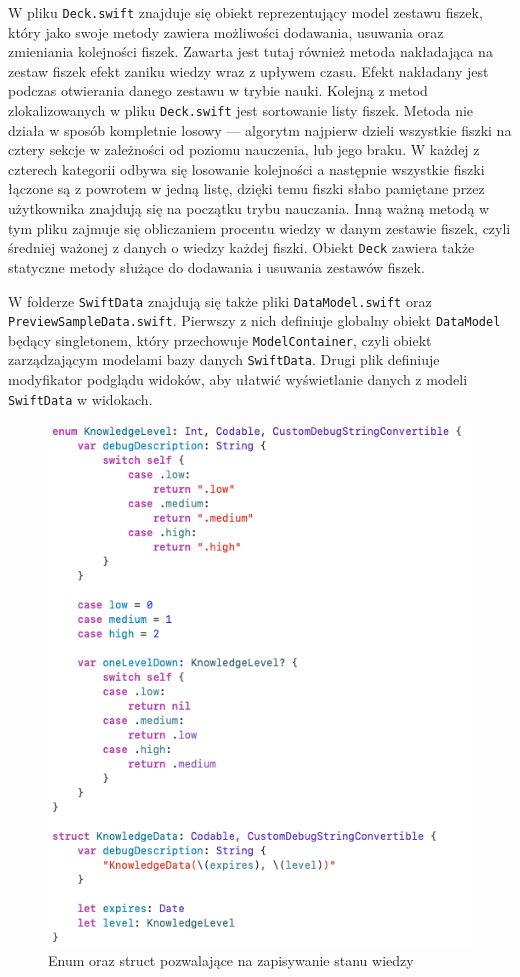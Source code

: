 \documentclass[final,a4paper,openany,12pt]{mwbk}
\begin{document}
W pliku \texttt{Deck.swift} znajduje się obiekt reprezentujący model zestawu fiszek, który jako swoje metody zawiera możliwości dodawania, usuwania oraz zmieniania kolejności fiszek. Zawarta jest tutaj również metoda nakładająca na zestaw fiszek efekt zaniku wiedzy wraz z upływem czasu. Efekt nakładany jest podczas otwierania danego zestawu w trybie nauki. Kolejną z metod zlokalizowanych w pliku \texttt{Deck.swift} jest sortowanie listy fiszek. Metoda nie działa w sposób kompletnie losowy --- algorytm najpierw dzieli wszystkie fiszki na cztery sekcje w zależności od poziomu nauczenia, lub jego braku. W każdej z czterech kategorii odbywa się losowanie kolejności a następnie wszystkie fiszki łączone są z powrotem w jedną listę, dzięki temu fiszki słabo pamiętane przez użytkownika znajdują się na początku trybu nauczania. Inną ważną metodą w tym pliku zajmuje się obliczaniem procentu wiedzy w danym zestawie fiszek, czyli średniej ważonej z danych o wiedzy każdej fiszki. Obiekt \texttt{Deck} zawiera także statyczne metody służące do dodawania i usuwania zestawów fiszek. 

W folderze \texttt{SwiftData} znajdują się także pliki \texttt{DataModel.swift} oraz \texttt{PreviewSampleData.swift}. Pierwszy z nich definiuje globalny obiekt \texttt{DataModel} będący singletonem, który przechowuje \texttt{ModelContainer}, czyli obiekt zarządzającym modelami bazy danych \texttt{SwiftData}. Drugi plik definiuje modyfikator podglądu widoków, aby ułatwić wyświetlanie danych z modeli \texttt{SwiftData} w widokach.

\begin{figure}[H]
    \centering
    \includegraphics[width=0.7\linewidth]{img/swiftdata3.png}
    \caption{Enum oraz struct pozwalające na zapisywanie stanu wiedzy}
    \label{fig:swiftdata3}
\end{figure}
\end{document}
